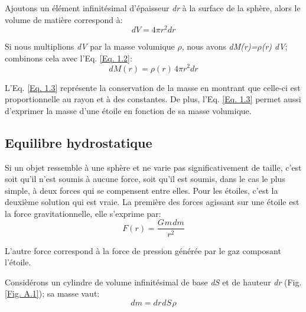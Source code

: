 Ajoutons un élément infinitésimal d'épaisseur \textit{dr} à la surface de la sphère, alors le volume de matière correspond à:\begin{equation} dV=4\pi r^{2}dr\label{Eq. 1.2}\end{equation}

Si nous multiplions \textit{dV} par la masse volumique \textit{$\rho$}, nous avons\textit{ dM(r)=$\rho$(r) dV}; combinons cela avec l'Eq. \ref{Eq. 1.2}:\begin{equation} \boxed{dM(r)=\rho(r)\hspace{2pt}4\pi r^{2}dr}\label{Eq.
	1.3}\end{equation}


\vfill
{}

L'Eq. \ref{Eq. 1.3} représente la conservation de la masse en montrant que celle-ci est proportionnelle au rayon et à des constantes. De plus, l'Eq. \ref{Eq. 1.3} permet aussi d'exprimer la masse d'une étoile en fonction de sa masse volumique.

\subsection{Equilibre hydrostatique}\label{1.1.2}

Si un objet ressemble à une sphère et ne varie pas significativement de taille, c'est soit qu'il n'est soumis à aucune force, soit qu'il est soumis, dans le cas le plus simple, à deux forces qui se compensent entre elles. Pour les étoiles, c'est la deuxième solution qui est vraie. La première des forces agissant sur une étoile est la force gravitationnelle, elle s'exprime par: \begin{equation} F(r)=\frac{G\hspace{1pt}m\hspace{1pt}dm}{r^{2}}\label{Eq. 1.4}\end{equation}

L'autre force correspond à la force de pression générée par le gaz composant l'étoile.\smallskip

Considérons un cylindre de volume infinitésimal de base \textit{dS} et de hauteur \textit{dr} (Fig. \ref{Fig. A.1}); sa masse vaut:\begin{equation}dm=dr\hspace{1pt}dS\hspace{1pt}\rho\label{Eq. 1.5}\end{equation} 

